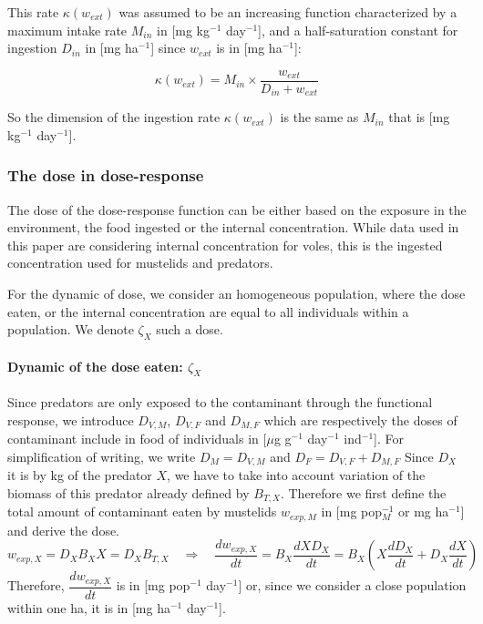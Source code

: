 \documentclass[11pt]{article}
\begin{document}
This rate $\kappa(w_{ext})$ was assumed to be an increasing function characterized by a maximum intake rate $M_{in}$ in [mg kg$^{-1}$ day$^{-1}$], and a half-saturation constant for ingestion $D_{in}$ in [mg ha$^{-1}$] since $w_{ext}$ is in [mg ha$^{-1}$]:

\begin{equation}
\kappa(w_{ext})= M_{in}\times \dfrac{ w_{ext}}{D_{in} + w_{ext}}
\end{equation}

So the dimension of the ingestion rate $\kappa(w_{ext})$ is the same as $M_{in}$ that is [mg kg$^{-1}$ day$^{-1}$].


\subsubsection{The dose in dose-response}

The dose of the dose-response function can be either based on the exposure in the environment, the food ingested or the internal concentration. While data used in this paper are considering internal concentration for voles, this is the ingested concentration used for mustelids and predators.

For the dynamic of dose, we consider an homogeneous population, where the dose eaten, or the internal concentration are equal to all individuals within a population. We denote $\zeta_X$ such a dose.

\paragraph{Dynamic of the dose eaten: $\zeta_X$}
%
Since predators are only exposed to the contaminant through the functional response, we introduce $D_{V,M}$, $D_{V,F}$ and $D_{M,F}$  which are respectively the doses of contaminant include in food of individuals in [$\mu$g g$^{-1}$ day$^{-1}$ ind$^{-1}$].
%
For simplification of writing, we write $D_M = D_{V,M}$ and $D_F = D_{V,F}+D_{M,F}$
%
Since $D_X$ it is by kg of the predator $X$, we have to take into account variation of the biomass of this predator already defined by $B_{T,X}$. Therefore we first define the total amount of contaminant eaten by mustelids $w_{exp,M}$ in [mg pop$_M^{-1}$ or mg ha$^{-1}$] and derive the dose.
%
\begin{equation}
w_{exp,X} = D_X B_X X = D_X B_{T,X} \quad \Rightarrow \quad \frac{dw_{exp,X}}{dt} = B_X \frac{dX D_X}{dt} = B_X \left( X \frac{dD_X}{dt} + D_X \frac{dX}{dt} \right)
\end{equation}
%
Therefore, $\dfrac{dw_{exp,X}}{dt}$ is in [mg pop$^{-1}$ day$^{-1}$] or, since we consider a close population within one ha, it is in  [mg ha$^{-1}$ day$^{-1}$].
\end{document}
